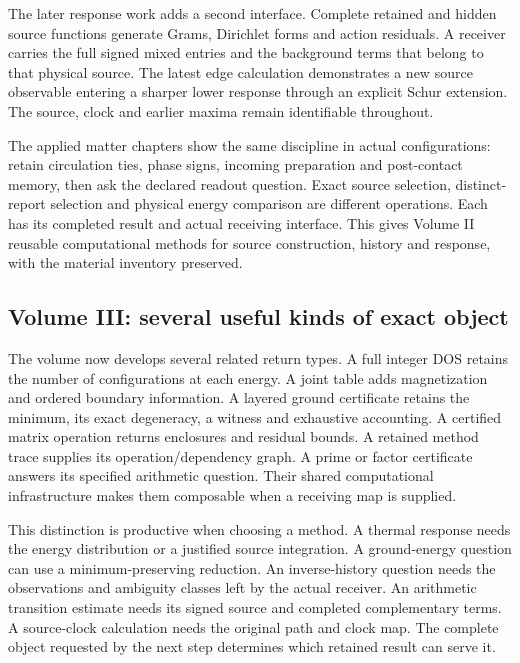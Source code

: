 The later response work adds a second interface. Complete retained and hidden source functions generate Grams, Dirichlet forms and action residuals. A receiver carries the full signed mixed entries and the background terms that belong to that physical source. The latest edge calculation demonstrates a new source observable entering a sharper lower response through an explicit Schur extension. The source, clock and earlier maxima remain identifiable throughout.

The applied matter chapters show the same discipline in actual configurations: retain circulation ties, phase signs, incoming preparation and post-contact memory, then ask the declared readout question. Exact source selection, distinct-report selection and physical energy comparison are different operations. Each has its completed result and actual receiving interface. This gives Volume II reusable computational methods for source construction, history and response, with the material inventory preserved.

\subsection{Volume III: several useful kinds of exact object}

The volume now develops several related return types. A full integer DOS retains the number of configurations at each energy. A joint table adds magnetization and ordered boundary information. A layered ground certificate retains the minimum, its exact degeneracy, a witness and exhaustive accounting. A certified matrix operation returns enclosures and residual bounds. A retained method trace supplies its operation/dependency graph. A prime or factor certificate answers its specified arithmetic question. Their shared computational infrastructure makes them composable when a receiving map is supplied.

This distinction is productive when choosing a method. A thermal response needs the energy distribution or a justified source integration. A ground-energy question can use a minimum-preserving reduction. An inverse-history question needs the observations and ambiguity classes left by the actual receiver. An arithmetic transition estimate needs its signed source and completed complementary terms. A source-clock calculation needs the original path and clock map. The complete object requested by the next step determines which retained result can serve it.

